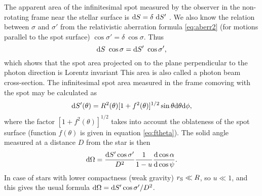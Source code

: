 \documentclass{wihuri}
\def\rg{r_{\rm S}} %
\def\be{\begin{equation}}
\def\ee{\end{equation}}
\def\d{{\rm d}}
\def\rg{r_{\rm S}} %
\def\Dop{\delta}
\begin{document}
The apparent area of the infinitesimal spot measured by the observer in the non-rotating frame near the stellar surface %
is $\d S=\Dop\ \d S'$ \cite{terrell}\cite{lightman75}.
We also know the relation between $\sigma$ and $\sigma'$ from the relativistic aberration formula \ref{eq:aberr2} (for motions parallel to the spot surface) $\cos\sigma' =   \Dop \ \cos\sigma$. Thus 
\be \label{eq:Salpha2}
\d S\ \cos\sigma = \d S'\ \cos\sigma', 
\ee
which shows that the spot area projected on to the plane perpendicular to the photon direction is Lorentz invariant \cite{lightman75}\cite{lindbland85}%
This area is also called a photon beam cross-section.
The infinitesimal spot area measured in the frame comoving with the spot may be calculated as \cite{morsink} %
\be \label{eq:surf_element}
\d S'(\theta) = R^{2}(\theta) [1+f^{2}(\theta)]^{1/2} \sin \theta \d \theta \d \phi,
\ee
where the factor $[1+f^{2}(\theta)]^{1/2}$ takes into account the oblateness of the spot surface (function $f(\theta)$ is given in equation \ref{eq:ftheta}).
The solid angle measured at a distance $D$ from the star is then \cite{morsink}
\be\label{eq:omega2}
 \d\Omega=\frac{\d S' \cos \sigma'}{D^2} \frac{1}{1-u} \frac{\d\cos\alpha}{\d\cos\psi}.
\ee
In case of stars with lower compactness (weak gravity) $\rg \ll R$, so $u\ll 1$, and this gives
the usual formula $\d\Omega=\d S' \cos \sigma'/D^2$. 

\end{document}
